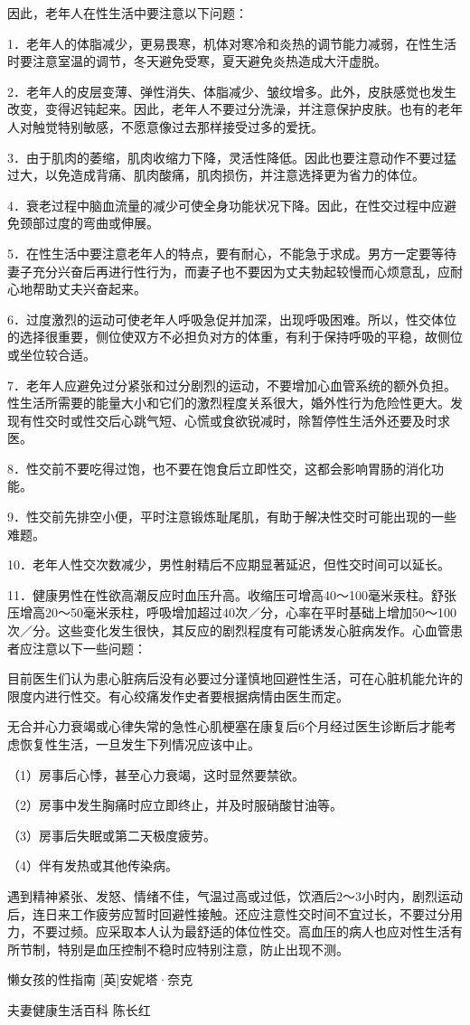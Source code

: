 \documentclass[12pt,UTF8]{ctexbook}
\begin{document}
因此，老年人在性生活中要注意以下问题：

1．老年人的体脂减少，更易畏寒，机体对寒冷和炎热的调节能力减弱，在性生活时要注意室温的调节，冬天避免受寒，夏天避免炎热造成大汗虚脱。

2．老年人的皮层变薄、弹性消失、体脂减少、皱纹增多。此外，皮肤感觉也发生改变，变得迟钝起来。因此，老年人不要过分洗澡，并注意保护皮肤。也有的老年人对触觉特别敏感，不愿意像过去那样接受过多的爱抚。

3．由于肌肉的萎缩，肌肉收缩力下降，灵活性降低。因此也要注意动作不要过猛过大，以免造成背痛、肌肉酸痛，肌肉损伤，并注意选择更为省力的体位。

4．衰老过程中脑血流量的减少可使全身功能状况下降。因此，在性交过程中应避免颈部过度的弯曲或伸展。

5．在性生活中要注意老年人的特点，要有耐心，不能急于求成。男方一定要等待妻子充分兴奋后再进行性行为，而妻子也不要因为丈夫勃起较慢而心烦意乱，应耐心地帮助丈夫兴奋起来。

6．过度激烈的运动可使老年人呼吸急促并加深，出现呼吸困难。所以，性交体位的选择很重要，侧位使双方不必担负对方的体重，有利于保持呼吸的平稳，故侧位或坐位较合适。

7．老年人应避免过分紧张和过分剧烈的运动，不要增加心血管系统的额外负担。性生活所需要的能量大小和它们的激烈程度关系很大，婚外性行为危险性更大。发现有性交时或性交后心跳气短、心慌或食欲锐减时，除暂停性生活外还要及时求医。

8．性交前不要吃得过饱，也不要在饱食后立即性交，这都会影响胃肠的消化功能。

9．性交前先排空小便，平时注意锻炼耻尾肌，有助于解决性交时可能出现的一些难题。

10．老年人性交次数减少，男性射精后不应期显著延迟，但性交时间可以延长。

11．健康男性在性欲高潮反应时血压升高。收缩压可增高40～100毫米汞柱。舒张压增高20～50毫米汞柱，呼吸增加超过40次／分，心率在平时基础上增加50～100次／分。这些变化发生很快，其反应的剧烈程度有可能诱发心脏病发作。心血管患者应注意以下一些问题：

目前医生们认为患心脏病后没有必要过分谨慎地回避性生活，可在心脏机能允许的限度内进行性交。有心绞痛发作史者要根据病情由医生而定。

无合并心力衰竭或心律失常的急性心肌梗塞在康复后6个月经过医生诊断后才能考虑恢复性生活，一旦发生下列情况应该中止。

（1）房事后心悸，甚至心力衰竭，这时显然要禁欲。

（2）房事中发生胸痛时应立即终止，并及时服硝酸甘油等。

（3）房事后失眠或第二天极度疲劳。

（4）伴有发热或其他传染病。

遇到精神紧张、发怒、情绪不佳，气温过高或过低，饮酒后2～3小时内，剧烈运动后，连日来工作疲劳应暂时回避性接触。还应注意性交时间不宜过长，不要过分用力，不要过频。应采取本人认为最舒适的体位性交。高血压的病人也应对性生活有所节制，特别是血压控制不稳时应特别注意，防止出现不测。







\backmatter

懒女孩的性指南    [英]安妮塔·奈克

夫妻健康生活百科  陈长红
\end{document}
